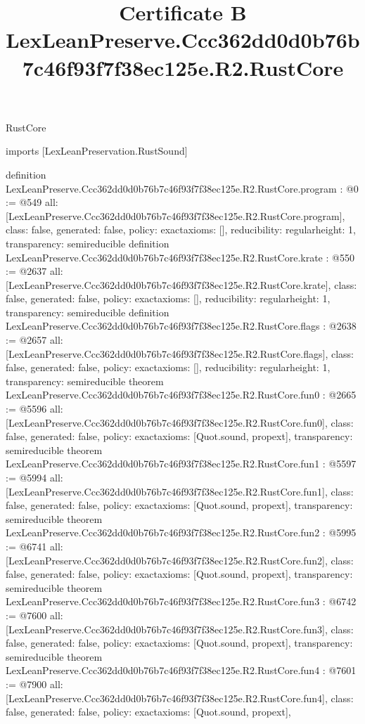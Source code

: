 \begin{lexlean}{RustCore}
\title{Certificate B LexLeanPreserve.Ccc362dd0d0b76b7c46f93f7f38ec125e.R2.RustCore}
\begin{coremodule}
imports [LexLeanPreservation.RustSound]

definition LexLeanPreserve.Ccc362dd0d0b76b7c46f93f7f38ec125e.R2.RustCore.program : @0 := @549 {
  all: [LexLeanPreserve.Ccc362dd0d0b76b7c46f93f7f38ec125e.R2.RustCore.program],
  class: false,
  generated: false,
  policy: exact{axioms: []},
  reducibility: regular{height: 1},
  transparency: semireducible
}
definition LexLeanPreserve.Ccc362dd0d0b76b7c46f93f7f38ec125e.R2.RustCore.krate : @550 := @2637 {
  all: [LexLeanPreserve.Ccc362dd0d0b76b7c46f93f7f38ec125e.R2.RustCore.krate],
  class: false,
  generated: false,
  policy: exact{axioms: []},
  reducibility: regular{height: 1},
  transparency: semireducible
}
definition LexLeanPreserve.Ccc362dd0d0b76b7c46f93f7f38ec125e.R2.RustCore.flags : @2638 := @2657 {
  all: [LexLeanPreserve.Ccc362dd0d0b76b7c46f93f7f38ec125e.R2.RustCore.flags],
  class: false,
  generated: false,
  policy: exact{axioms: []},
  reducibility: regular{height: 1},
  transparency: semireducible
}
theorem LexLeanPreserve.Ccc362dd0d0b76b7c46f93f7f38ec125e.R2.RustCore.fun0 : @2665 := @5596 {
  all: [LexLeanPreserve.Ccc362dd0d0b76b7c46f93f7f38ec125e.R2.RustCore.fun0],
  class: false,
  generated: false,
  policy: exact{axioms: [Quot.sound, propext]},
  transparency: semireducible
}
theorem LexLeanPreserve.Ccc362dd0d0b76b7c46f93f7f38ec125e.R2.RustCore.fun1 : @5597 := @5994 {
  all: [LexLeanPreserve.Ccc362dd0d0b76b7c46f93f7f38ec125e.R2.RustCore.fun1],
  class: false,
  generated: false,
  policy: exact{axioms: [Quot.sound, propext]},
  transparency: semireducible
}
theorem LexLeanPreserve.Ccc362dd0d0b76b7c46f93f7f38ec125e.R2.RustCore.fun2 : @5995 := @6741 {
  all: [LexLeanPreserve.Ccc362dd0d0b76b7c46f93f7f38ec125e.R2.RustCore.fun2],
  class: false,
  generated: false,
  policy: exact{axioms: [Quot.sound, propext]},
  transparency: semireducible
}
theorem LexLeanPreserve.Ccc362dd0d0b76b7c46f93f7f38ec125e.R2.RustCore.fun3 : @6742 := @7600 {
  all: [LexLeanPreserve.Ccc362dd0d0b76b7c46f93f7f38ec125e.R2.RustCore.fun3],
  class: false,
  generated: false,
  policy: exact{axioms: [Quot.sound, propext]},
  transparency: semireducible
}
theorem LexLeanPreserve.Ccc362dd0d0b76b7c46f93f7f38ec125e.R2.RustCore.fun4 : @7601 := @7900 {
  all: [LexLeanPreserve.Ccc362dd0d0b76b7c46f93f7f38ec125e.R2.RustCore.fun4],
  class: false,
  generated: false,
  policy: exact{axioms: [Quot.sound, propext]},
}
\end{coremodule}
\end{lexlean}
